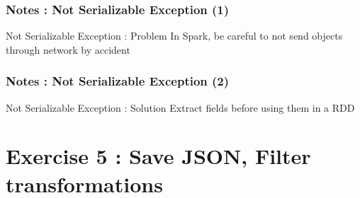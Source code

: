 \documentclass[slidetop,9pt,utf8]{beamer}
\begin{document}
\begin{frame}[fragile]
  \frametitle{Notes : Not Serializable Exception (1)}

  \begin{exampleblock}{Not Serializable Exception : Problem}
    In Spark, be careful to not send objects through network by accident
  \end{exampleblock}

  

\end{frame}

\begin{frame}[fragile]
  \frametitle{Notes : Not Serializable Exception (2)}

  \begin{exampleblock}{Not Serializable Exception : Solution}
    Extract fields before using them in a RDD
  \end{exampleblock}

  

\end{frame}

%
%
%
%

\section{Exercise 5 : Save JSON, Filter transformations}
\end{document}
